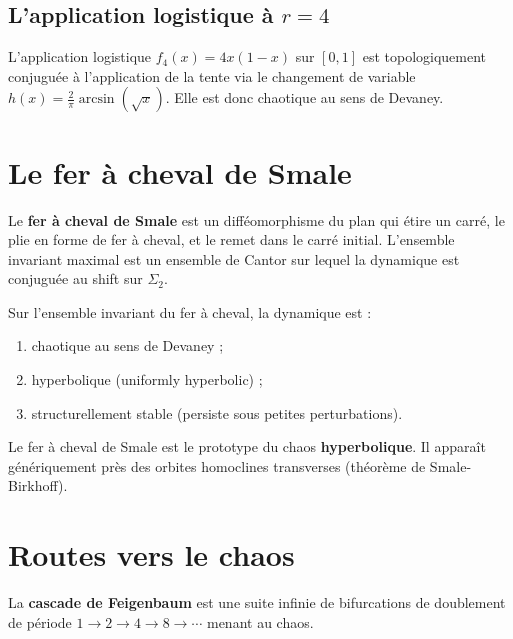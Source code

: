 \subsection{L'application logistique \`a $r = 4$}

\begin{theoreme}
L'application logistique $f_4(x) = 4x(1-x)$ sur $[0,1]$ est topologiquement
conjugu\'ee \`a l'application de la tente via le changement de variable
$h(x) = \frac{2}{\pi}\arcsin(\sqrt{x})$. Elle est donc chaotique au sens
de Devaney.
\end{theoreme}

\section{Le fer \`a cheval de Smale}

\begin{definition}
Le \textbf{fer \`a cheval de Smale} est un diff\'eomorphisme du plan qui
\'etire un carr\'e, le plie en forme de fer \`a cheval, et le remet dans
le carr\'e initial. L'ensemble invariant maximal est un ensemble de Cantor
sur lequel la dynamique est conjugu\'ee au shift sur $\Sigma_2$.
\end{definition}

\begin{theoreme}[Smale, 1967]
Sur l'ensemble invariant du fer \`a cheval, la dynamique est :
\begin{enumerate}
    \item chaotique au sens de Devaney ;
    \item hyperbolique (uniformly hyperbolic) ;
    \item structurellement stable (persiste sous petites perturbations).
\end{enumerate}
\end{theoreme}

\begin{remarque}
Le fer \`a cheval de Smale est le prototype du chaos \textbf{hyperbolique}.
Il appara\^it g\'en\'eriquement pr\`es des orbites homoclines transverses
(th\'eor\`eme de Smale-Birkhoff).
\end{remarque}

\section{Routes vers le chaos}

\begin{definition}
La \textbf{cascade de Feigenbaum} est une suite infinie de bifurcations de
doublement de p\'eriode $1 \to 2 \to 4 \to 8 \to \cdots$ menant au chaos.
\end{definition}

